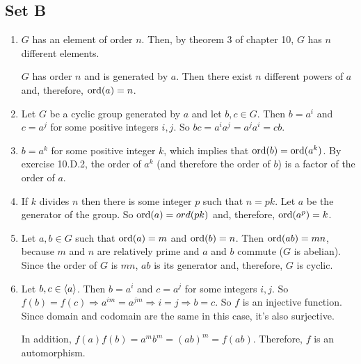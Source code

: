 \subsection{Set B}
\begin{enumerate}
    \item $ G $ has an element of order $ n $. Then, by theorem 3 of chapter 10, $ G $ has $ n $ different elements.

    $ G $ has order $ n $ and is generated by $ a $. Then there exist $ n $ different powers of $ a $ and, therefore, $ \operatorname{ord}(a) = n$.

    \item Let $ G $ be a cyclic group generated by $ a $ and let $ b, c \in G $. Then $ b = a^i $ and $ c = a^j $ for some positive integers $ i, j $. So $ bc = a^ia^j = a^ja^i = cb $.

    \item $ b = a^k $ for some positive integer $ k $, which implies that $ \operatorname{ord}(b) = \operatorname{ord}(a^k) $. By exercise 10.D.2, the order of $ a^k $ (and therefore the order of $ b $) is a factor of the order of $ a $.

    \item If $ k $ divides $ n $ then there is some integer $ p $ such that $ n = pk $. Let $ a $ be the generator of the group. So $ \operatorname{ord}(a) = ord(pk) $ and, therefore, $ \operatorname{ord}(a^p) = k $.

    \item Let $ a, b \in G $ such that $ \operatorname{ord}(a) = m $ and $ \operatorname{ord}(b) = n $. Then $ \operatorname{ord}(ab) = mn $, because $ m $ and $ n $ are relatively prime and $ a $ and $ b $ commute ($ G $ is abelian). Since the order of $ G $ is $ mn $, $ ab $ is its generator and, therefore, $ G $ is cyclic.

    \item Let $ b, c \in \langle a\rangle $. Then $ b = a^i $  and $ c = a^j $ for some integers $ i, j $. So $ f(b) = f(c) \Rightarrow    a^{im} = a^{jm} \Rightarrow i = j \Rightarrow b = c$. So $ f $ is an injective function. Since domain and codomain are the same in this case, it's also surjective.

    In addition, $ f(a)f(b) = a^mb^m  = (ab)^m = f(ab) $. Therefore, $ f $ is an automorphism.
\end{enumerate}

